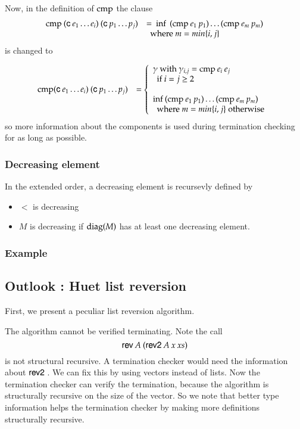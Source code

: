 \noindent Now, in the definition of $\mathrm{cmp}$ the clause  
\[
\begin{array}[t]{ll}
\mathrm{cmp} \: (\mathsf{c} \: e_1 \ldots e_i) \: (\mathsf{c} \: p_1 \ldots p_j ) & = \: \mathrm{inf}\: \: (\mathrm{cmp} \: e_1 \: p_1) \ldots (\mathrm{cmp} \: e_m \: p_m)\\
& \: \mbox { where } m = min\{i,j\}\\ 
\end{array}
\]
is changed to

\[
\begin{array}[t]{ll}
\mathrm{cmp} (\mathsf{c} \: e_1 \ldots e_i) \: (\mathsf{c} \: p_1 \ldots p_j ) & = 
\left\{\begin{array}{l} \gamma \mbox{ with } \gamma_{i,j} = \mathrm{cmp} \: e_i \: e_j \\
\: \mbox{ if } i = j \geq 2 \\
\\
\mathrm{inf}\: (\mathrm{cmp} \: e_1 \: p_1) \ldots (\mathrm{cmp} \: e_m \: p_m)\\
\: \mbox { where } m = min\{i,j\} \mbox{ otherwise } 
\end{array}
\right.
\end{array}
\]
so more information about the components is used during termination checking for as long as possible.

\subsubsection{Decreasing element}
In the extended order, a decreasing element is recursevly defined by
\begin{itemize}
\item
$<$ is decreasing
\item
$M$ is decreasing if $\mathrm{diag}(M)$ has at least one decreasing element.
\end{itemize}

\subsubsection{Example}

\subsection{Outlook : Huet list reversion}
First, we present a peculiar list reversion algorithm.

The algorithm cannot be verified terminating.
Note the call 
\[\mathsf{rev}\: A \: (\mathsf{rev2}\: A \: x \: xs)\]
is not structural recursive.
A termination checker would need the information about $\mathsf{rev2}\:$.
We can fix this by using vectors instead of lists. Now the termination checker can verify the termination, because the algorithm is structurally recursive on the size of the vector.
So we note that better type information helps the termination checker by making more definitions structurally recursive.

